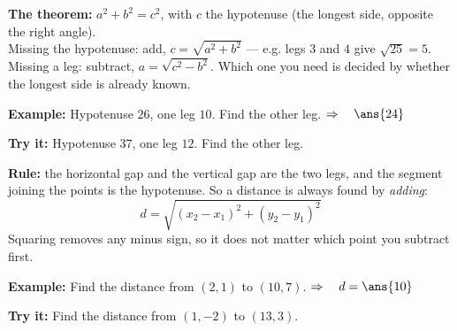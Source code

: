 \documentclass[12pt]{article}
\begin{document}


\begin{formulabox}
\textbf{The theorem:} \quad $a^2 + b^2 = c^2$, with $c$ the hypotenuse (the longest side, opposite
the right angle).\\[3pt]
Missing the hypotenuse: add, $c = \sqrt{a^2 + b^2}$ --- e.g. legs $3$ and $4$ give $\sqrt{25} = 5$.\\[2pt]
Missing a leg: subtract, $a = \sqrt{c^2 - b^2}$. Which one you need is decided by whether the
longest side is already known.
\end{formulabox}

\begin{examplebox}
\textbf{Example:} \quad Hypotenuse $26$, one leg $10$. Find the other leg.
$\Rightarrow\quad \ans{24}$
\end{examplebox}

\begin{tryitbox}
\textbf{Try it:} \quad Hypotenuse $37$, one leg $12$. Find the other leg.\\[2pt]
\end{tryitbox}


\begin{formulabox}
\textbf{Rule:} the horizontal gap and the vertical gap are the two legs, and the segment joining
the points is the hypotenuse. So a distance is always found by \textit{adding}:
\[ d = \sqrt{(x_2 - x_1)^2 + (y_2 - y_1)^2} \]
Squaring removes any minus sign, so it does not matter which point you subtract first.
\end{formulabox}

\begin{examplebox}
\textbf{Example:} \quad Find the distance from $(2, 1)$ to $(10, 7)$.
$\Rightarrow\quad d = \ans{10}$
\end{examplebox}

\begin{tryitbox}
\textbf{Try it:} \quad Find the distance from $(1, -2)$ to $(13, 3)$.\\[2pt]
\end{tryitbox}
\end{document}
